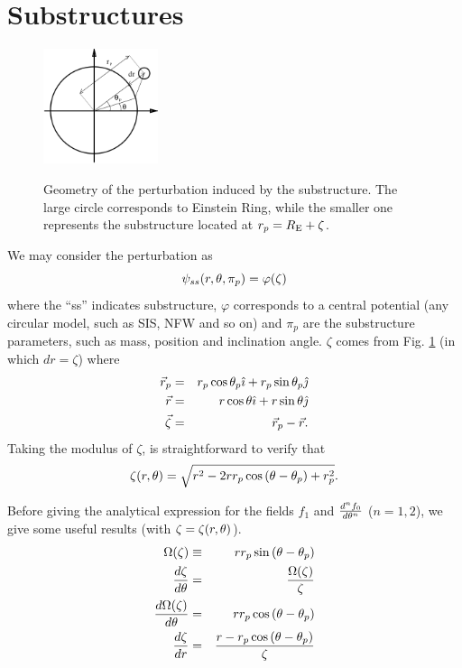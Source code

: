 \section{Substructures}
\begin{figure}
  \begin{center}
   \includegraphics[width=0.30\textwidth]{graphics/Fig_subsstructure.pdf}
\label{fig:substruc}
  \end{center}
    \caption{Geometry of the perturbation induced by the substructure. The large circle corresponds to Einstein Ring,
  while the smaller one represents the substructure located at $r_p=R_{\mathrm{E}} +\zeta$.}
\end{figure}

We may consider the perturbation as
\begin{equation}
\psi_{ss}(r,\theta,\pi_p)=\varphi(\zeta)
\end{equation}
where the ``ss'' indicates substructure, $\varphi$ corresponds to a central potential (any circular model, such as SIS, NFW and so on) and $\pi_p$
are the substructure parameters, such as mass, position and inclination angle. $\zeta$ comes from Fig. \ref{fig:substruc} (in which $dr=\zeta$)
where
\begin{eqnarray}
\vec{r}_p&=&r_p\cos{\theta_p}\hat{\imath} + r_p\sin{\theta_p}\hat{\jmath}\\
\vec{r}&=&r\cos{\theta}\hat{\imath} + r\sin{\theta}\hat{\jmath}\\
\vec{\zeta}&=&\vec{r}_p-\vec{r}.
\end{eqnarray}
Taking the modulus of $\zeta$, is straightforward to verify that
\begin{equation}
\zeta(r,\theta)=\sqrt{r^2-2r r_p\cos{(\theta-\theta_p)}+r^2_p}.
\label{xirte}
\end{equation}

Before giving the analytical expression for the fields $f_1$ and ${d^nf_0 \over d\theta^n}$ ($n=1,2$), we
give some useful results (with $\zeta = \zeta(r,\theta)$).
\begin{eqnarray}
\Omega(\zeta) & \equiv & r r_p \sin{(\theta-\theta_p)} \\
\dfrac{d\zeta}{d\theta}&=&  \dfrac{\Omega(\zeta)}{\zeta}\\
\dfrac{d\Omega(\zeta)}{d\theta}&=&r r_p\cos{(\theta-\theta_p)}\\
\dfrac{d\zeta}{dr}&=&\dfrac{r-r_p\cos{(\theta-\theta_p)}}{\zeta}
\end{eqnarray}


